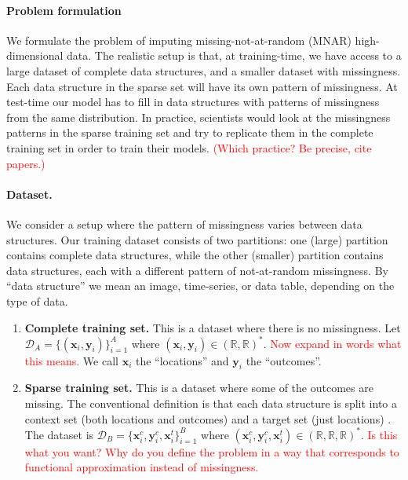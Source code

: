 \documentclass[a4paper,12pt,twoside,openright]{article}
\newcommand{\crit}[1]{\textcolor{red}{#1}}
\begin{document}
\paragraph{Problem formulation}

We formulate the problem of imputing missing-not-at-random (MNAR) high-dimensional data. The realistic setup is that, at training-time, we have access to a large dataset of complete data structures, and a smaller dataset with missingness. Each data structure in the sparse set will have its own pattern of missingness. At test-time our model has to fill in data structures with patterns of missingness from the same distribution. In practice, scientists would look at the missingness patterns in the sparse training set and try to replicate them in the complete training set in order to train their models. \crit{(Which practice? Be precise, cite papers.)}

\paragraph{Dataset.} We consider a setup where the pattern of missingness varies between data structures. Our training dataset consists of two partitions: one (large) partition contains complete data structures, while the other (smaller) partition contains data structures, each with a different pattern of not-at-random missingness. By ``data structure'' we mean an image, time-series, or data table, depending on the type of data.

\begin{enumerate}
    \item \textbf{Complete training set.} This is a dataset where there is no missingness. Let $\mathcal{D}_A = \{(\mathbf{x}_i, \mathbf{y}_i)\}_{i=1}^{A}$ where $(\mathbf{x}_i, \mathbf{y}_i) \in (\mathbb{R}, \mathbb{R})^*$. \crit{Now expand in words what this means.
    } We call $\mathbf{x}_i$ the ``locations'' and $\mathbf{y}_i$ the ``outcomes''.
    \item \textbf{Sparse training set.} This is a dataset where some of the outcomes are missing. The conventional definition is that each data structure is split into a context set (both locations and outcomes) and a target set (just locations) \parencite{garneloConditionalNeuralProcesses2018}. The dataset is $\mathcal{D}_B = \{\mathbf{x}^c_i, \mathbf{y}^c_i, \mathbf{x}^t_i\}_{i=1}^{B}$ where $(\mathbf{x}^c_i, \mathbf{y}^c_i, \mathbf{x}^t_i) \in (\mathbb{R}, \mathbb{R}, \mathbb{R})^*$. \crit{Is this what you want? Why do you define the problem in a way that corresponds to functional approximation instead of missingness.}
\end{enumerate}
\end{document}
